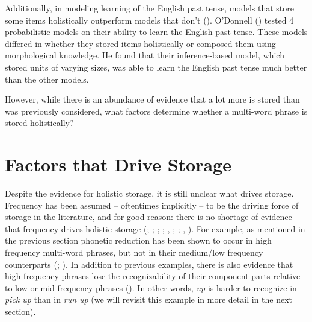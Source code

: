\documentclass[
  12pt,
  letterpaper,
]{scrreprt}
\begin{document}
Additionally, in modeling learning of the English past tense, models
that store some items holistically outperform models that don't
().
O'Donnell ()
tested 4 probabilistic models on their ability to learn the English past
tense. These models differed in whether they stored items holistically
or composed them using morphological knowledge. He found that their
inference-based model, which stored units of varying sizes, was able to
learn the English past tense much better than the other models.

However, while there is an abundance of evidence that a lot more is
stored than was previously considered, what factors determine whether a
multi-word phrase is stored holistically?

\section{Factors that Drive
Storage}\label{sec-factors-that-drive-storage}

Despite the evidence for holistic storage, it is still unclear what
drives storage. Frequency has been assumed -- oftentimes implicitly --
to be the driving force of storage in the literature, and for good
reason: there is no shortage of evidence that frequency drives holistic
storage (;
;
;
; ,
;
; ,
). For example, as
mentioned in the previous section phonetic reduction has been shown to
occur in high frequency multi-word phrases, but not in their medium/low
frequency counterparts (;
).
In addition to previous examples, there is also evidence that high
frequency phrases lose the recognizability of their component parts
relative to low or mid frequency phrases
(). In other words, \emph{up} is harder to recognize in
\emph{pick up} than in \emph{run up} (we will revisit this example in
more detail in the next section).
\end{document}
